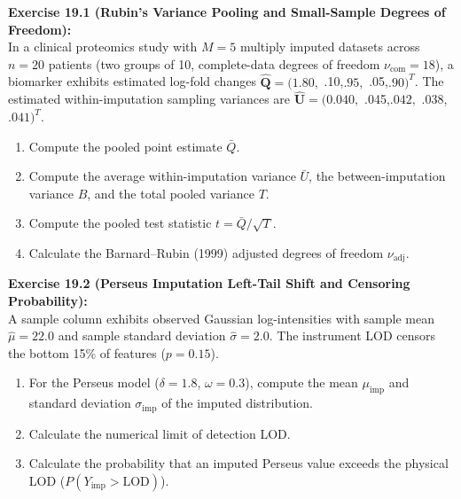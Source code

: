 \documentclass[11pt,oneside]{book}
\begin{document}
\noindent
\textbf{Exercise 19.1 (Rubin's Variance Pooling and Small-Sample Degrees of Freedom):}\\
In a clinical proteomics study with $M = 5$ multiply imputed datasets across $n = 20$ patients (two groups of 10, complete-data degrees of freedom $\nu_{\text{com}} = 18$), a biomarker exhibits estimated log-fold changes $\hat{\mathbf{Q}} = (1.80,$ .10,$ .95,$ .05,$ .90)^T$. The estimated within-imputation sampling variances are $\hat{\mathbf{U}} = (0.040,$ .045,$ .042,$ .038,$ .041)^T$.
\begin{enumerate}
    \item Compute the pooled point estimate $\bar{Q}$.
    \item Compute the average within-imputation variance $\bar{U}$, the between-imputation variance $B$, and the total pooled variance $T$.
    \item Compute the pooled test statistic $t = \bar{Q} / \sqrt{T}$.
    \item Calculate the Barnard--Rubin (1999) adjusted degrees of freedom $\nu_{\text{adj}}$.
\end{enumerate}

\vspace{0.8em}
\noindent
\textbf{Exercise 19.2 (Perseus Imputation Left-Tail Shift and Censoring Probability):}\\
A sample column exhibits observed Gaussian log-intensities with sample mean $\hat{\mu} = 22.0$ and sample standard deviation $\hat{\sigma} = 2.0$. The instrument LOD censors the bottom 15\% of features ($p = 0.15$). 
\begin{enumerate}
    \item For the Perseus model ($\delta = 1.8$, $\omega = 0.3$), compute the mean $\mu_{\text{imp}}$ and standard deviation $\sigma_{\text{imp}}$ of the imputed distribution.
    \item Calculate the numerical limit of detection LOD.
    \item Calculate the probability that an imputed Perseus value exceeds the physical LOD ($P(Y_{\text{imp}} > \text{LOD})$).
\end{enumerate}
\end{document}
